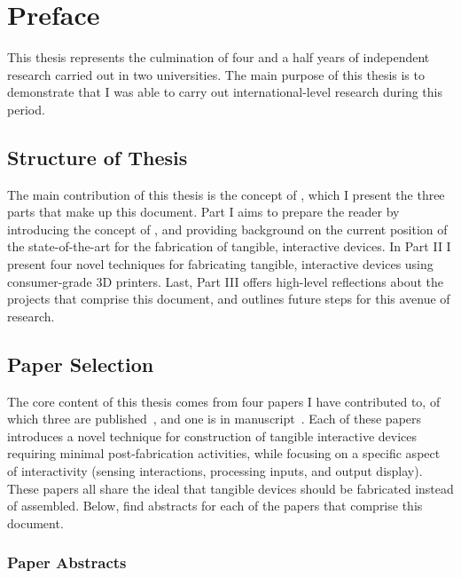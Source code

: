 \chapter*{Preface}\label{ch:preface}
  This thesis represents the culmination of four and a half years of independent
  research carried out in two universities. The main purpose of this thesis is
  to demonstrate that I was able to carry out international-level research
  during this period.

  \section*{Structure of Thesis}
    The main contribution of this thesis is the concept of \papf, which I
    present the three parts that make up this document. Part I aims to prepare
    the reader by introducing the concept of \papf, and providing background on
    the current position of the state-of-the-art for the fabrication of
    tangible, interactive devices. In Part II I present four novel techniques
    for fabricating tangible, interactive devices using consumer-grade 3D
    printers. Last, Part III offers high-level reflections about the projects
    that comprise this document, and outlines future steps for this avenue of
    research.

  \section*{Paper Selection}
    The core content of this thesis comes from four papers I have contributed
    to, of which three are published~\cite{Tejada:2018, Tejada:2020, Kim:2021a},
    and one is in manuscript~\cite{Tejada:}. Each of these papers introduces a
    novel technique for construction of tangible interactive devices requiring
    minimal post-fabrication activities, while focusing on a specific aspect of
    interactivity (sensing interactions, processing inputs, and output display).
    These papers all share the \papf ideal that tangible devices should be
    fabricated instead of assembled. Below, find abstracts for each of the
    papers that comprise this document.

  \subsection*{Paper Abstracts}
